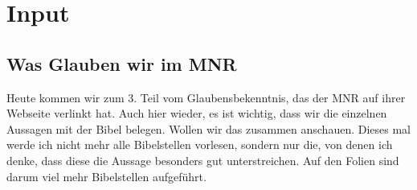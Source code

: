\documentclass{../../inc/mybib}
\begin{document}
\section{ Input }
\begin{spacing}{1.5}
\subsection{Was Glauben wir im MNR}
Heute kommen wir zum 3. Teil vom Glaubensbekenntnis, das der MNR auf ihrer Webseite verlinkt hat. Auch hier wieder, es ist wichtig, dass wir die einzelnen Aussagen mit der Bibel belegen. Wollen wir das zusammen anschauen. Dieses mal werde ich nicht mehr alle Bibelstellen vorlesen, sondern nur die, von denen ich denke, dass diese die Aussage besonders gut unterstreichen. Auf den Folien sind darum viel mehr Bibelstellen aufgeführt. 


\end{spacing}
\end{document}

